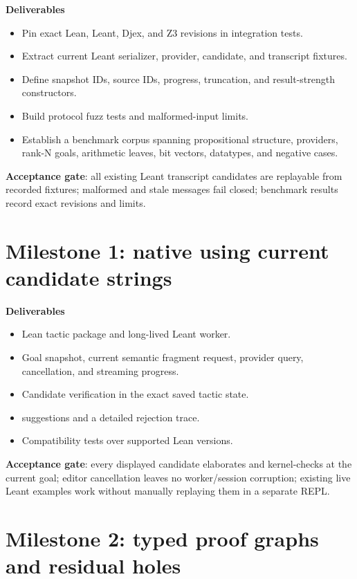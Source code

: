 \documentclass[11pt,letterpaper,openany]{report}
\newcommand{\code}[1]{\texttt{\detokenize{#1}}}
\begin{document}
\textbf{Deliverables}

\begin{itemize}
  \item Pin exact Lean, Leant, Djex, and Z3 revisions in integration tests.
  \item Extract current Leant serializer, provider, candidate, and transcript fixtures.
  \item Define snapshot IDs, source IDs, progress, truncation, and result-strength
        constructors.
  \item Build protocol fuzz tests and malformed-input limits.
  \item Establish a benchmark corpus spanning propositional structure, providers,
        rank-N goals, arithmetic leaves, bit vectors, datatypes, and negative cases.
\end{itemize}

\textbf{Acceptance gate}: all existing Leant transcript candidates are replayable from
recorded fixtures; malformed and stale messages fail closed; benchmark results record
exact revisions and limits.

\section{Milestone 1: native \code{leant?} using current candidate strings}

\textbf{Deliverables}

\begin{itemize}
  \item Lean tactic package and long-lived Leant worker.
  \item Goal snapshot, current semantic fragment request, provider query, cancellation,
        and streaming progress.
  \item Candidate verification in the exact saved tactic state.
  \item \code{TryThis} suggestions and a detailed rejection trace.
  \item Compatibility tests over supported Lean versions.
\end{itemize}

\textbf{Acceptance gate}: every displayed candidate elaborates and kernel-checks at the
current goal; editor cancellation leaves no worker/session corruption; existing live
Leant examples work without manually replaying them in a separate REPL.

\section{Milestone 2: typed proof graphs and residual holes}
\end{document}
